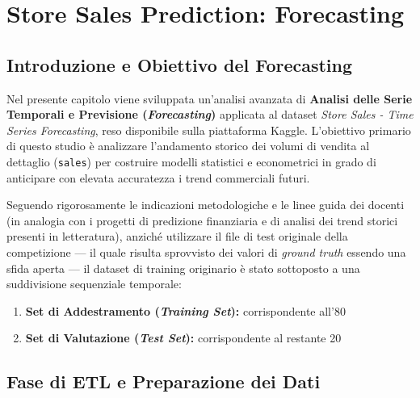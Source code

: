 \chapter{Store Sales Prediction: Forecasting}
\label{cap:forecasting}

\section{Introduzione e Obiettivo del Forecasting}
\label{sec:intro_forecasting}

Nel presente capitolo viene sviluppata un'analisi avanzata di \textbf{Analisi delle Serie Temporali e Previsione (\emph{Forecasting})} applicata al dataset \textit{Store Sales - Time Series Forecasting}, reso disponibile sulla piattaforma Kaggle. L'obiettivo primario di questo studio è analizzare l'andamento storico dei volumi di vendita al dettaglio (\texttt{sales}) per costruire modelli statistici e econometrici in grado di anticipare con elevata accuratezza i trend commerciali futuri.

Seguendo rigorosamente le indicazioni metodologiche e le linee guida dei docenti (in analogia con i progetti di predizione finanziaria e di analisi dei trend storici presenti in letteratura), anziché utilizzare il file di test originale della competizione — il quale risulta sprovvisto dei valori di \textit{ground truth} essendo una sfida aperta — il dataset di training originario è stato sottoposto a una suddivisione sequenziale temporale:
\begin{enumerate}
    \item \textbf{Set di Addestramento (\emph{Training Set}):} corrispondente all'80%
    \item \textbf{Set di Valutazione (\textit{Test Set}):} corrispondente al restante 20%
\end{enumerate}

\section{Fase di ETL e Preparazione dei Dati}
\label{sec:etl_forecasting}

